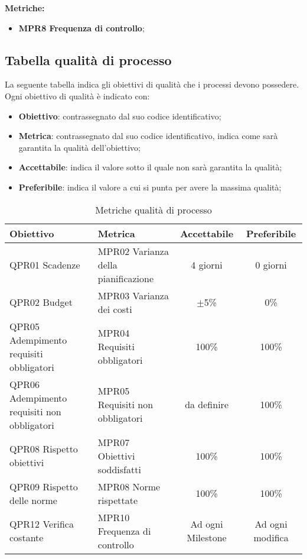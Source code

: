 \documentclass[../piano_di_qualifica.tex]{subfiles}
\begin{document}
\textbf{Metriche:}
\smallbreak
\begin{itemize}
	\item \textbf{MPR8 Frequenza di controllo};
\end{itemize}

\subsection{Tabella qualità di processo}
La seguente tabella indica gli obiettivi di qualità che i processi devono possedere.\\
Ogni obiettivo di qualità è indicato con:
\smallbreak
\begin{itemize}
	\item \textbf{Obiettivo}: contrassegnato dal suo codice identificativo;
	\item \textbf{Metrica}: contrassegnato dal suo codice identificativo, indica come sarà garantita la qualità dell'obiettivo;
	\item \textbf{Accettabile}: indica il valore sotto il quale non sarà garantita la qualità;
	\item \textbf{Preferibile}: indica il valore a cui si punta per avere la massima qualità;
\end{itemize}

\begin{table}[!ht]
	\centering
	\begin{tabular}{|p{5.5cm}|p{4.5cm}|c|c|}
		\hline
		\rowcolor{lightgray}
		\textbf{Obiettivo}                          & \textbf{Metrica}                    & \textbf{Accettabile} & \textbf{Preferibile} \\
		\hline
		QPR01 Scadenze                              & MPR02 Varianza della pianificazione & 4 giorni             & 0 giorni             \\
		QPR02 Budget                                & MPR03 Varianza dei costi            & $\pm$5\%             & 0\%                  \\
		QPR05 Adempimento requisiti obbligatori     & MPR04 Requisiti obbligatori         & 100\%                & 100\%                \\
		QPR06 Adempimento requisiti non obbligatori & MPR05 Requisiti non obbligatori     & da definire          & 100\%                \\
		QPR08 Rispetto obiettivi                    & MPR07 Obiettivi soddisfatti         & 100\%                & 100\%                \\
		QPR09 Rispetto delle norme                  & MPR08 Norme rispettate              & 100\%                & 100\%                \\
		QPR12 Verifica costante                     & MPR10 Frequenza di controllo        & Ad ogni Milestone    & Ad ogni modifica     \\
		\hline
	\end{tabular}
	\caption{Metriche qualità di processo}
\end{table}

\clearpage
\end{document}
